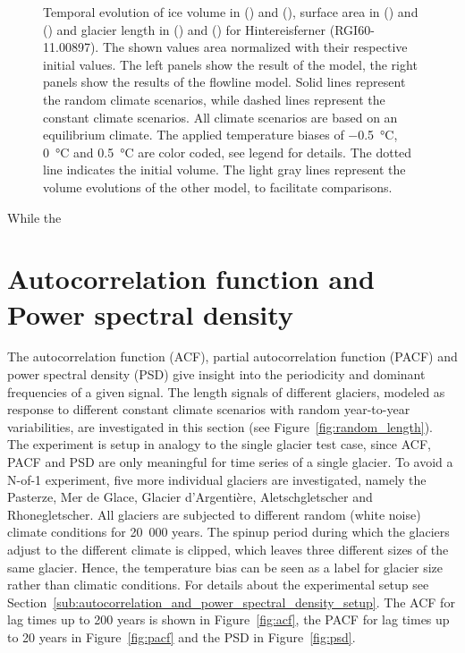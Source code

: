 \begin{figure}[p]
      \caption{Temporal evolution of ice volume in () and (), surface area in () and () and glacier length in () and () for Hintereisferner (RGI60-11.00897). The shown values area normalized with their respective initial values. The left panels show the result of the \vas{} model, the right panels show the results of the flowline model. Solid lines represent the random climate scenarios, while dashed lines represent the constant climate scenarios. All climate scenarios are based on an equilibrium climate. The applied temperature biases of \SI{-.5}{\celsius}, \SI{0}{\celsius} and \SI{+.5}{\celsius} are color coded, see legend for details. The dotted line indicates the initial volume. The light gray lines represent the volume evolutions of the other model, to facilitate comparisons.}
      \label{fig:hintereisferner}
    \end{figure}

    While the



  \section{Autocorrelation function and Power spectral density} %
  \label{sec:autocorrelation_and_power_spectral_density_results}
    
    The autocorrelation function (ACF), partial autocorrelation function (PACF) and power spectral density (PSD) give insight into the periodicity and dominant frequencies of a given signal. The length signals of different  glaciers, modeled as response to different constant climate scenarios with random year-to-year variabilities, are investigated in this section (see Figure~\ref{fig:random_length}). The experiment is setup in analogy to the single glacier test case, since ACF, PACF and PSD are only meaningful for time series of a single glacier. To avoid a N-of-1 experiment, five more individual glaciers are investigated, namely the Pasterze, Mer de Glace, Glacier d'Argentière, Aletschgletscher and Rhonegletscher. All glaciers are subjected to different random (white noise) climate conditions for 20\ 000 years. The spinup period during which the glaciers adjust to the different climate is clipped, which leaves three different sizes of the same glacier. Hence, the temperature bias can be seen as a label for glacier size rather than climatic conditions. For details about the experimental setup see Section~\ref{sub:autocorrelation_and_power_spectral_density_setup}. The ACF for lag times up to 200 years is shown in Figure~\ref{fig:acf}, the PACF for lag times up to 20 years in Figure~\ref{fig:pacf} and the PSD in Figure~\ref{fig:psd}.

